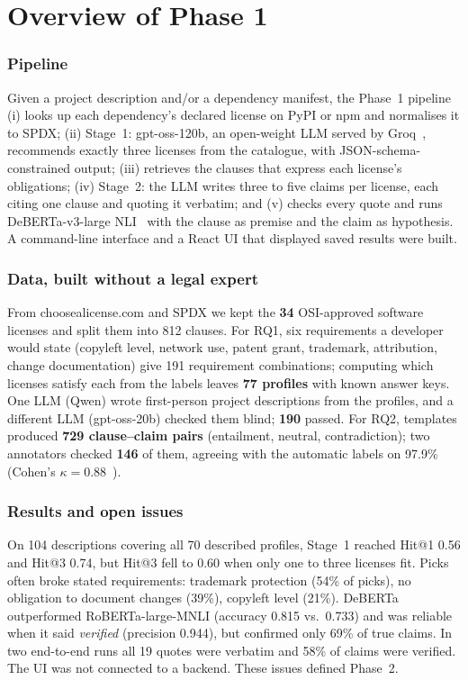 \section{Overview of Phase 1}
\label{s:phase1}

\subsubsection{Pipeline}
Given a project description and/or a dependency manifest, the Phase~1 pipeline (i) looks up each dependency's declared license on PyPI or npm and normalises it to SPDX; (ii) Stage~1: gpt-oss-120b, an open-weight LLM served by Groq~\cite{groq}, recommends exactly three licenses from the catalogue, with JSON-schema-constrained output; (iii) retrieves the clauses that express each license's obligations; (iv) Stage~2: the LLM writes three to five claims per license, each citing one clause and quoting it verbatim; and (v) checks every quote and runs DeBERTa-v3-large NLI~\cite{he2023debertav3,laurer2024less} with the clause as premise and the claim as hypothesis. A command-line interface and a React UI that displayed saved results were built.

\subsubsection{Data, built without a legal expert}
From choosealicense.com and SPDX we kept the \textbf{34} OSI-approved software licenses and split them into 812 clauses. For RQ1, six requirements a developer would state (copyleft level, network use, patent grant, trademark, attribution, change documentation) give 191 requirement combinations; computing which licenses satisfy each from the labels leaves \textbf{77 profiles} with known answer keys. One LLM (Qwen) wrote first-person project descriptions from the profiles, and a different LLM (gpt-oss-20b) checked them blind; \textbf{190} passed. For RQ2, templates produced \textbf{729 clause--claim pairs} (entailment, neutral, contradiction); two annotators checked \textbf{146} of them, agreeing with the automatic labels on 97.9\% (Cohen's $\kappa = 0.88$~\cite{cohen1960kappa}).

\subsubsection{Results and open issues}
On 104 descriptions covering all 70 described profiles, Stage~1 reached Hit@1 0.56 and Hit@3 0.74, but Hit@3 fell to 0.60 when only one to three licenses fit. Picks often broke stated requirements: trademark protection (54\% of picks), no obligation to document changes (39\%), copyleft level (21\%). DeBERTa outperformed RoBERTa-large-MNLI (accuracy 0.815 vs.\ 0.733) and was reliable when it said \emph{verified} (precision 0.944), but confirmed only 69\% of true claims. In two end-to-end runs all 19 quotes were verbatim and 58\% of claims were verified. The UI was not connected to a backend. These issues defined Phase~2.
